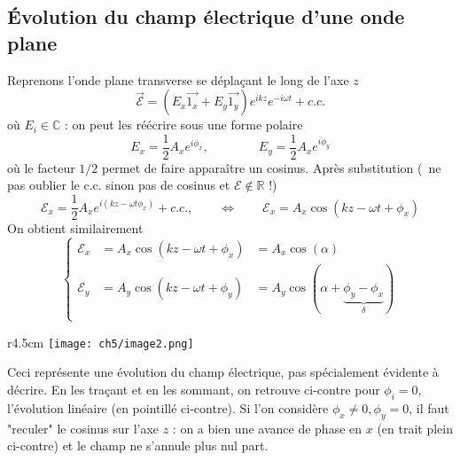 	\subsection{Évolution du champ électrique d'une onde plane}
	Reprenons l'onde plane transverse se déplaçant le long de l'axe $z$
	\begin{equation}
	\vec{\mathcal{E}} = (E_x\vec{1_x}+E_y\vec{1_y})e^{ikz}e^{-i\omega t} + c.c.
	\end{equation}
	où $E_i\in\mathbb{C}$ : on peut les réécrire sous une forme polaire
	\begin{equation}
	E_x = \frac{1}{2}A_x e^{i\phi_x},\qquad\qquad E_y = \frac{1}{2}A_x e^{i\phi_y}
	\end{equation}
	où le facteur $1/2$ permet de faire apparaître un cosinus. 	Après substitution 
	(\danger\ ne pas oublier le c.c. sinon pas de cosinus et $\mathcal{E}\notin\mathbb{R}$ !)
	\begin{equation}
	\mathcal{E}_x = \frac{1}{2}A_x e^{i(kz-\omega t\phi_x)} + c.c.,\qquad\Leftrightarrow\qquad 
	\mathcal{E}_x = A_x\cos(kz-\omega t +\phi_x)
	\end{equation}
	On obtient similairement
	\begin{equation}
	\left\{\begin{array}{lll}
	\mathcal{E}_x &= A_x\cos(kz-\omega t +\phi_x) &= A_x\cos(\alpha)\\
	\mathcal{E}_y &= A_y\cos(kz-\omega t +\phi_y) &= A_y\cos(\alpha+\underbrace{\phi_y-\phi_x}_{\delta})\\
	\end{array}\right.
	\end{equation}
	
	\begin{wrapfigure}[9]{r}{4.5cm}
	\vspace{-9mm}
	\texttt{[image: ch5/image2.png]}
	\end{wrapfigure}
	Ceci représente une évolution du champ électrique, pas spécialement évidente à décrire. 
	En les traçant et en les sommant, on retrouve ci-contre pour $\phi_i=0$, l'évolution linéaire 
	(en pointillé ci-contre). 
	Si l'on considère $\phi_x\neq0,\phi_y=0$, il faut "reculer" le cosinus sur l'axe $z$ : on 
	a bien une avance de phase en $x$ (en trait plein ci-contre) et le champ ne s'annule plus nul 
	part.\\
	
